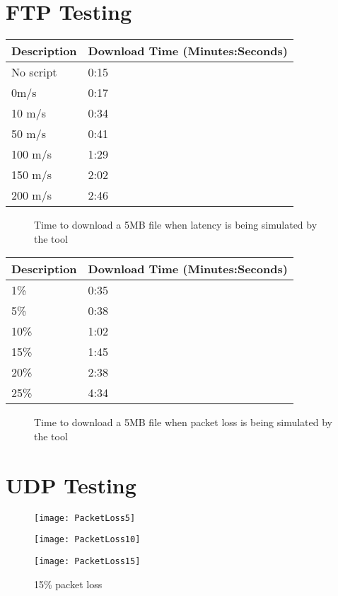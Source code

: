 \begin{appendices}
\chapter{FTP Testing}
\label{ref:ftpTesting}
\begin{center}

\begin{tabular}{| l | l |}
	\hline
	{\bf Description} 	& {\bf Download Time (Minutes:Seconds)} \\\hline
	No script			& 0:15 \\\hline
	0m/s				& 0:17 \\\hline
	10 	m/s				& 0:34 \\\hline
	50 	m/s				& 0:41 \\\hline
	100 m/s				& 1:29 \\\hline
	150 m/s				& 2:02 \\\hline
	200 m/s				& 2:46 \\\hline
		
\end{tabular}
\begin{figure}[h]
		\caption{Time to download a 5MB file when latency is being simulated by the tool}
	\end{figure}	

\begin{tabular}{| l | l |}
	\hline
	{\bf Description} 	& {\bf Download Time (Minutes:Seconds)} \\\hline
	1\%					& 0:35 \\\hline
	5\%					& 0:38 \\\hline
	10\%				& 1:02 \\\hline
	15\%				& 1:45 \\\hline
	20\%				& 2:38 \\\hline
	25\%				& 4:34 \\\hline
\end{tabular}
\begin{figure}[h]
		\caption{Time to download a 5MB file when packet loss is being simulated by the tool}
\end{figure}	
\end{center}

%
\chapter{UDP Testing}
\label{ref:udpTesting}
\newcommand{\udpScale}{0.5}
\newcommand{\figureText}[1]{#1\% packet loss}

\begin{figure}[!htb]
  \texttt{[image: PacketLoss5]}
  \caption{\figureText{5}}
\endminipage\hfill
{}
  \texttt{[image: PacketLoss10]}
  \caption{\figureText{10}}
\endminipage\hfill
{}
  \texttt{[image: PacketLoss15]}
  \caption{\figureText{15}}
\endminipage
\end{figure}


\end{appendices}
